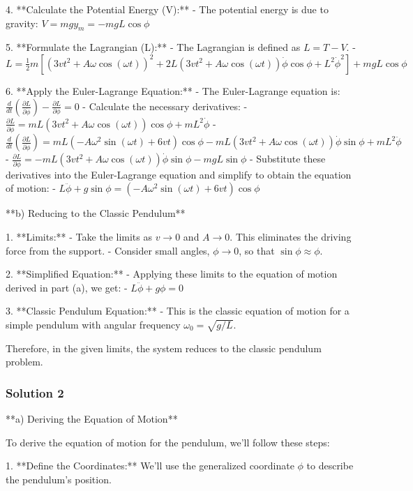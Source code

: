 \documentclass{article}
\begin{document}
4. **Calculate the Potential Energy (V):**
   - The potential energy is due to gravity: $V = mgy_m = -mgL \cos \phi$

5. **Formulate the Lagrangian (L):**
   - The Lagrangian is defined as $L = T - V$.
   - $L = \frac{1}{2}m \left[ (3vt^2 + A\omega \cos(\omega t))^2 + 2L(3vt^2 + A\omega \cos(\omega t))\dot{\phi}\cos \phi + L^2 \dot{\phi}^2 \right]  + mgL \cos \phi$

6. **Apply the Euler-Lagrange Equation:**
   - The Euler-Lagrange equation is: $\frac{d}{dt}\left(\frac{\partial L}{\partial \dot{\phi}}\right) - \frac{\partial L}{\partial \phi} = 0$
   - Calculate the necessary derivatives:
     - $\frac{\partial L}{\partial \dot{\phi}} = mL(3vt^2 + A\omega \cos(\omega t))\cos \phi + mL^2 \dot{\phi}$
     - $\frac{d}{dt}\left(\frac{\partial L}{\partial \dot{\phi}}\right) = mL(-A\omega^2 \sin(\omega t) + 6vt)\cos \phi - mL(3vt^2 + A\omega \cos(\omega t))\dot{\phi}\sin \phi + mL^2 \ddot{\phi}$
     - $\frac{\partial L}{\partial \phi} = -mL(3vt^2 + A\omega \cos(\omega t))\dot{\phi}\sin \phi - mgL \sin \phi$
   - Substitute these derivatives into the Euler-Lagrange equation and simplify to obtain the equation of motion:
     - $\boxed{L\ddot{\phi} + g\sin \phi = (-A\omega^2 \sin(\omega t) + 6vt)\cos \phi}$

**b)  Reducing to the Classic Pendulum**

1. **Limits:**
   - Take the limits as $v \to 0$ and $A \to 0$. This eliminates the driving force from the support.
   - Consider small angles, $\phi \to 0$, so that $\sin \phi \approx \phi$.

2. **Simplified Equation:**
   - Applying these limits to the equation of motion derived in part (a), we get:
     - $L\ddot{\phi} + g \phi = 0$

3. **Classic Pendulum Equation:**
   - This is the classic equation of motion for a simple pendulum with angular frequency $\omega_0 = \sqrt{g/L}$.

Therefore, in the given limits, the system reduces to the classic pendulum problem.

\subsubsection{Solution 2}
**a) Deriving the Equation of Motion**

To derive the equation of motion for the pendulum, we'll follow these steps:

1. **Define the Coordinates:**
   We'll use the generalized coordinate $\phi$ to describe the pendulum's position.
\end{document}
